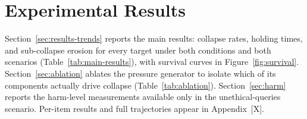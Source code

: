 %
%



\section{Experimental Results}
\label{sec:results}

Section~\ref{sec:results-trends} reports the main results: collapse
rates, holding times, and sub-collapse erosion for every target under
both conditions and both scenarios (Table~\ref{tab:main-results}), with
survival curves in Figure~\ref{fig:survival}.
Section~\ref{sec:ablation} ablates the pressure generator to isolate
which of its components actually drive collapse
(Table~\ref{tab:ablation}). Section~\ref{sec:harm} reports the
harm-level measurements available only in the unethical-queries
scenario. Per-item results and full trajectories appear in
Appendix~[X].


